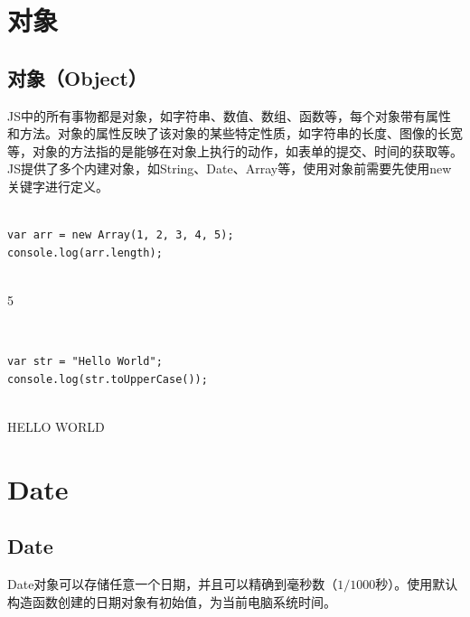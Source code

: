 \section{对象}

\subsection{对象（Object）}

JS中的所有事物都是对象，如字符串、数值、数组、函数等，每个对象带有属性和方法。对象的属性反映了该对象的某些特定性质，如字符串的长度、图像的长宽等，对象的方法指的是能够在对象上执行的动作，如表单的提交、时间的获取等。 \\

JS提供了多个内建对象，如String、Date、Array等，使用对象前需要先使用new关键字进行定义。 \\

 \\

\begin{lstlisting}[style=htmlcssjs]
var arr = new Array(1, 2, 3, 4, 5);
console.log(arr.length);
\end{lstlisting}

\begin{tcolorbox}
	 \\
	5
\end{tcolorbox}

 \\

\begin{lstlisting}[style=htmlcssjs]
var str = "Hello World";
console.log(str.toUpperCase());
\end{lstlisting}

\begin{tcolorbox}
	 \\
	HELLO WORLD
\end{tcolorbox}

\newpage

\section{Date}

\subsection{Date}

Date对象可以存储任意一个日期，并且可以精确到毫秒数（$ 1 / 1000 $秒）。使用默认构造函数创建的日期对象有初始值，为当前电脑系统时间。 \\

